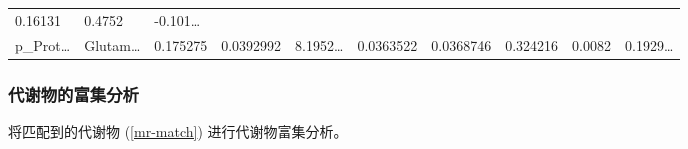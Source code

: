 \documentclass[
]{article}
\begin{document}
\begin{longtable}[]{@{}llllllllll@{}}
\begin{minipage}[t]{0.07\columnwidth}
0.16131\strut
\end{minipage} & \begin{minipage}[t]{0.07\columnwidth}\raggedright
0.4752\strut
\end{minipage} & \begin{minipage}[t]{0.07\columnwidth}\raggedright
-0.101\ldots{}\strut
\end{minipage}\tabularnewline
\begin{minipage}[t]{0.07\columnwidth}\raggedright
p\_Prot\ldots{}\strut
\end{minipage} & \begin{minipage}[t]{0.07\columnwidth}\raggedright
Glutam\ldots{}\strut
\end{minipage} & \begin{minipage}[t]{0.07\columnwidth}\raggedright
0.175275\strut
\end{minipage} & \begin{minipage}[t]{0.07\columnwidth}\raggedright
0.0392992\strut
\end{minipage} & \begin{minipage}[t]{0.07\columnwidth}\raggedright
8.1952\ldots{}\strut
\end{minipage} & \begin{minipage}[t]{0.07\columnwidth}\raggedright
0.0363522\strut
\end{minipage} & \begin{minipage}[t]{0.07\columnwidth}\raggedright
0.0368746\strut
\end{minipage} & \begin{minipage}[t]{0.07\columnwidth}\raggedright
0.324216\strut
\end{minipage} & \begin{minipage}[t]{0.07\columnwidth}\raggedright
0.0082\strut
\end{minipage} & \begin{minipage}[t]{0.07\columnwidth}\raggedright
0.1929\ldots{}\strut
\end{minipage}\tabularnewline
\bottomrule
\end{longtable}

\hypertarget{ux4ee3ux8c22ux7269ux7684ux5bccux96c6ux5206ux6790}{%
\subsubsection{代谢物的富集分析}\label{ux4ee3ux8c22ux7269ux7684ux5bccux96c6ux5206ux6790}}

将匹配到的代谢物 (\ref{mr-match}) 进行代谢物富集分析。
\end{document}
